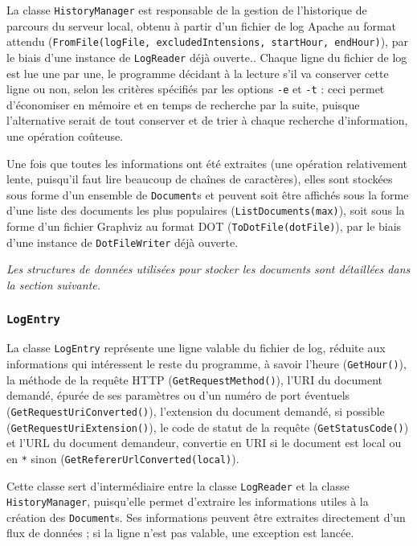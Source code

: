 \documentclass[11pt,a4paper]{article}
\begin{document}
La classe \texttt{HistoryManager} est responsable de la gestion de l'historique de parcours du serveur local, obtenu à partir d'un fichier de log Apache au format attendu (\texttt{FromFile(logFile, excludedIntensions, startHour, endHour)}), par le biais d'une instance de \texttt{LogReader} déjà ouverte.. Chaque ligne du fichier de log est lue une par une, le programme décidant à la lecture s'il va conserver cette ligne ou non, selon les critères spécifiés par les options \texttt{-e} et \texttt{-t} : ceci permet d'économiser en mémoire et en temps de recherche par la suite, puisque l'alternative serait de tout conserver et de trier à chaque recherche d'information, une opération coûteuse.

Une fois que toutes les informations ont été extraites (une opération relativement lente, puisqu'il faut lire beaucoup de chaînes de caractères), elles sont stockées sous forme d'un ensemble de \texttt{Document}s et peuvent soit être affichés sous la forme d'une liste des documents les plus populaires (\texttt{ListDocuments(max)}), soit sous la forme d'un fichier Graphviz au format DOT (\texttt{ToDotFile(dotFile)}), par le biais d'une instance de \texttt{DotFileWriter} déjà ouverte.

\textit{Les structures de données utilisées pour stocker les documents sont détaillées dans la section suivante.}

\subsubsection{\texttt{LogEntry}}

La classe \texttt{LogEntry} représente une ligne valable du fichier de log, réduite aux informations qui intéressent le reste du programme, à savoir l'heure (\texttt{GetHour()}), la méthode de la requête HTTP (\texttt{GetRequestMethod()}), l'URI du document demandé, épurée de ses paramètres ou d'un numéro de port éventuels (\texttt{GetRequestUriConverted()}), l'extension du document demandé, si possible (\texttt{GetRequestUriExtension()}), le code de statut de la requête (\texttt{GetStatusCode()}) et l'URL du document demandeur, convertie en URI si le document est local ou en \texttt{*} sinon (\texttt{GetRefererUrlConverted(local)}).

Cette classe sert d'intermédiaire entre la classe \texttt{LogReader} et la classe \texttt{HistoryManager}, puisqu'elle permet d'extraire les informations utiles à la création des \texttt{Document}s. Ses informations peuvent être extraites directement d'un flux de données ; si la ligne n'est pas valable, une exception est lancée.
\end{document}
